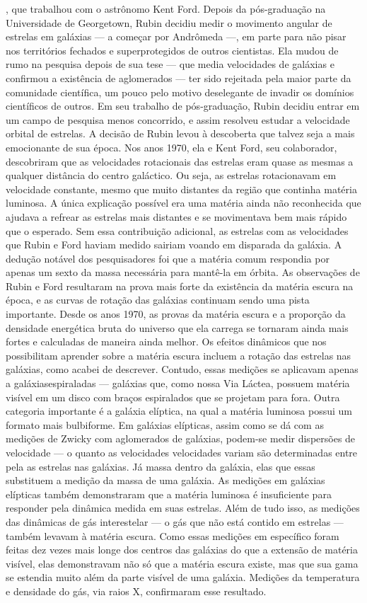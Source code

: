 \documentclass[
	article,			%
	11pt,				%
	oneside,			%
	a4paper,			%
	english,			%
	brazil,				%
	sumario=tradicional
	]{abntex2}
\begin{document}
,
que
trabalhou
com
o
astrônomo Kent Ford. Depois da pós-graduação na Universidade de Georgetown,
Rubin decidiu medir o movimento angular de estrelas em galáxias — a começar
por
Andrômeda
—,
em
parte
para
não
pisar
nos
territórios
fechados
e
superprotegidos de outros cientistas. Ela mudou de rumo na pesquisa depois de
sua
tese
—
que
media
velocidades
de
galáxias
e
conﬁrmou
a
existência
de
aglomerados — ter sido rejeitada pela maior parte da comunidade cientíﬁca, um
pouco pelo motivo deselegante de invadir os domínios cientíﬁcos de outros. Em
seu trabalho de pós-graduação, Rubin decidiu entrar em um campo de pesquisa
menos concorrido, e assim resolveu estudar a velocidade orbital de estrelas.
A decisão de Rubin levou à descoberta que talvez seja a mais emocionante de
sua época. Nos anos 1970, ela e Kent Ford, seu colaborador, descobriram que as
velocidades rotacionais das estrelas eram quase as mesmas a qualquer distância
do centro galáctico. Ou seja, as estrelas rotacionavam em velocidade constante,
mesmo que muito distantes da região que continha matéria luminosa. A única
explicação possível era uma matéria ainda não reconhecida que ajudava a refrear
as estrelas mais distantes e se movimentava bem mais rápido que o esperado. Sem
essa
contribuição
adicional,
as
estrelas
com
as
velocidades
que
Rubin
e
Ford
haviam medido sairiam voando em disparada da galáxia. A dedução notável dos
pesquisadores foi que a matéria comum respondia por apenas um sexto da massa
necessária para mantê-la em órbita. As observações de Rubin e Ford resultaram
na
prova
mais
forte
da
existência
da
matéria
escura
na
época,
e
as
curvas
de
rotação das galáxias continuam sendo uma pista importante.
Desde os anos 1970, as provas da matéria escura e a proporção da densidade
energética
bruta
do
universo
que
ela
carrega
se
tornaram
ainda
mais
fortes
e
calculadas de maneira ainda melhor. Os efeitos dinâmicos que nos possibilitam
aprender sobre a matéria escura incluem a rotação das estrelas nas galáxias, como
acabei
de
descrever.
Contudo,
essas
medições
se
aplicavam
apenas
a
galáxiasespiraladas — galáxias que, como nossa Via Láctea, possuem matéria visível em
um
disco
com
braços
espiralados
que
se
projetam
para
fora.
Outra
categoria
importante é a galáxia elíptica, na qual a matéria luminosa possui um formato
mais bulbiforme. Em galáxias elípticas, assim como se dá com as medições de
Zwicky com aglomerados de galáxias, podem-se medir dispersões de velocidade —
o
quanto
as
velocidades
velocidades
variam
são determinadas
entre
pela
as
estrelas
nas
galáxias.
Já
massa dentro da galáxia, elas
que
essas
substituem
a
medição da massa de uma galáxia. As medições em galáxias elípticas também
demonstraram
que
a
matéria
luminosa
é
insuﬁciente
para
responder
pela
dinâmica medida em suas estrelas. Além de tudo isso, as medições das dinâmicas
de gás interestelar — o gás que não está contido em estrelas — também levavam à
matéria escura. Como essas medições em especíﬁco foram feitas dez vezes mais
longe
dos
centros
das
galáxias
do
que
a
extensão
de
matéria
visível,
elas
demonstravam não só que a matéria escura existe, mas que sua gama se estendia
muito além da parte visível de uma galáxia. Medições da temperatura e densidade
do gás, via raios X, conﬁrmaram esse resultado.


\end{document}
